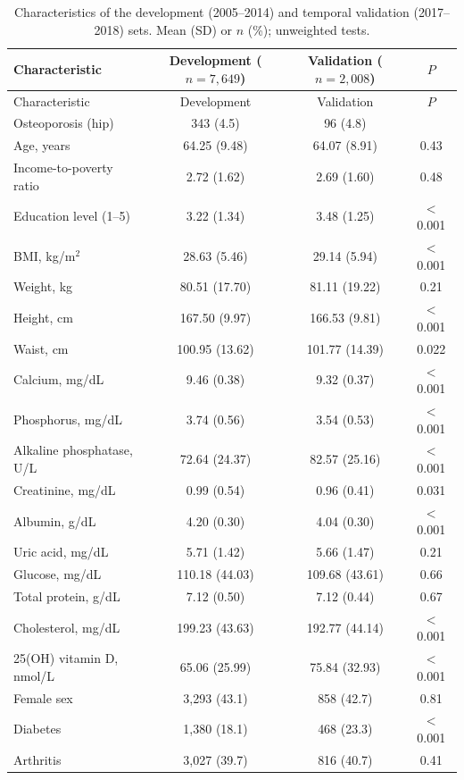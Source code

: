\documentclass[11pt,a4paper]{article}
\begin{document}
{\setlength{\tabcolsep}{4pt}\small
\begin{longtable}{lccc}
\caption{Characteristics of the development (2005--2014) and temporal validation (2017--2018) sets. Mean (SD) or $n$ (\%); unweighted tests.}\label{tab:devval}\\
\toprule
Characteristic & Development ($n=7{,}649$) & Validation ($n=2{,}008$) & $P$ \\
\midrule
\endfirsthead
\toprule
Characteristic & Development & Validation & $P$ \\
\midrule
\endhead
\bottomrule
\endfoot
Osteoporosis (hip) & 343 (4.5) & 96 (4.8) & \\
Age, years & 64.25 (9.48) & 64.07 (8.91) & 0.43 \\
Income-to-poverty ratio & 2.72 (1.62) & 2.69 (1.60) & 0.48 \\
Education level (1--5) & 3.22 (1.34) & 3.48 (1.25) & $<$0.001 \\
BMI, kg/m$^2$ & 28.63 (5.46) & 29.14 (5.94) & $<$0.001 \\
Weight, kg & 80.51 (17.70) & 81.11 (19.22) & 0.21 \\
Height, cm & 167.50 (9.97) & 166.53 (9.81) & $<$0.001 \\
Waist, cm & 100.95 (13.62) & 101.77 (14.39) & 0.022 \\
Calcium, mg/dL & 9.46 (0.38) & 9.32 (0.37) & $<$0.001 \\
Phosphorus, mg/dL & 3.74 (0.56) & 3.54 (0.53) & $<$0.001 \\
Alkaline phosphatase, U/L & 72.64 (24.37) & 82.57 (25.16) & $<$0.001 \\
Creatinine, mg/dL & 0.99 (0.54) & 0.96 (0.41) & 0.031 \\
Albumin, g/dL & 4.20 (0.30) & 4.04 (0.30) & $<$0.001 \\
Uric acid, mg/dL & 5.71 (1.42) & 5.66 (1.47) & 0.21 \\
Glucose, mg/dL & 110.18 (44.03) & 109.68 (43.61) & 0.66 \\
Total protein, g/dL & 7.12 (0.50) & 7.12 (0.44) & 0.67 \\
Cholesterol, mg/dL & 199.23 (43.63) & 192.77 (44.14) & $<$0.001 \\
25(OH) vitamin D, nmol/L & 65.06 (25.99) & 75.84 (32.93) & $<$0.001 \\
Female sex & 3,293 (43.1) & 858 (42.7) & 0.81 \\
Diabetes & 1,380 (18.1) & 468 (23.3) & $<$0.001 \\
Arthritis & 3,027 (39.7) & 816 (40.7) & 0.41 \\

\end{longtable}}
\end{document}
